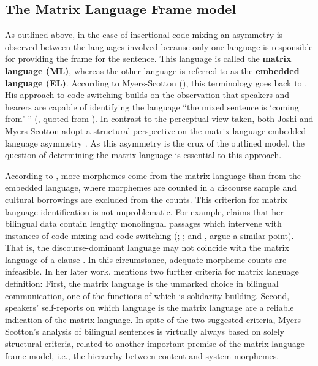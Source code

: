 \subsection {The Matrix Language Frame model}
As outlined above, in the case of insertional code-mixing an asymmetry is observed between the languages involved because only one language is responsible for providing the frame for the sentence. This language is called the \textbf{matrix language (ML)}, whereas the other language is referred to as the \textbf{embedded language (EL)}. According to Myers-Scotton (\citeyear{myers-scotton-duelling-1993}), this terminology goes back to \citet{joshi85}. His approach to code-switching builds on the observation that speakers and hearers are capable of identifying the language ``the mixed sentence is `coming from' '' (\citealt{joshi85}, quoted from \citealt[35]{myers-scotton-duelling-1993}). In contrast to the perceptual view taken, both Joshi and Myers-Scotton adopt a structural perspective on the matrix language-embedded language asymmetry \citep[cf.][35--37]{myers-scotton-duelling-1993}. As this asymmetry is the crux of the outlined model, the question of determining the matrix language is essential to this approach. 

According to \citet[68]{myers-scotton-duelling-1993}, more morphemes come from the matrix language than from the embedded language, where morphemes are counted in a discourse sample and cultural borrowings are excluded from the counts. This criterion for matrix language identification is not unproblematic. For example, \citet[19]{muhamedowa-untersuchung-2006} claims that her bilingual data contain lengthy monolingual passages which intervene with instances of code-mixing and code-switching (\citealt[102]{haust-codeswitching-1995}; \citealt[154]{boumans-syntax-1998}; and \citealt[196]{hlavac-second-generation-2003}, argue a similar point). That is, the discourse-dominant language may not coincide with the matrix language of a clause \citep[cf.][]{heller-conversation-1988}. In this circumstance, adequate morpheme counts are infeasible. In her later work, \citet[237]{milroy-lexically-1995} mentions two further criteria for matrix language definition: First, the matrix language is the unmarked choice in bilingual communication, one of the functions of which is solidarity building. Second, speakers' self-reports on which language is the matrix language are a reliable indication of the matrix language. In spite of the two suggested criteria, Myers-Scotton's analysis of bilingual sentences is virtually always based on solely structural criteria, related to another important premise of the matrix language frame model, i.e., the hierarchy between content and system morphemes.

